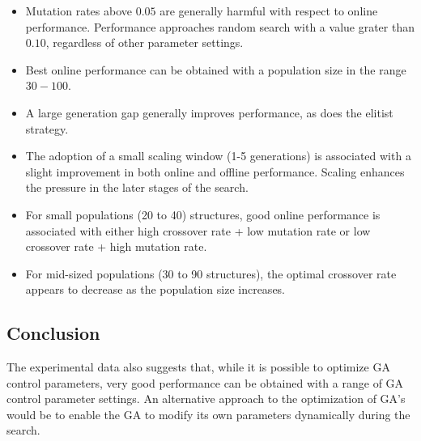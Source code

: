\documentclass[../main.tex]{subfiles}
\begin{document}
\begin{itemize}
	\item Mutation rates above $0.05$ are generally harmful with respect to online performance. Performance approaches
	random search with a value grater than $0.10$, regardless of other parameter settings.
	\item Best online performance can be obtained with a population size in the range $30 - 100$.
	\item A large generation gap generally improves performance, as does the elitist strategy.
	\item The adoption of a small scaling window (1-5 generations) is associated with a slight improvement in both
	online and offline performance. Scaling enhances the pressure in the later stages of the search.
	\item For small populations (20 to 40) structures, good online performance is associated with either high crossover
	rate + low mutation rate or low crossover rate + high mutation rate.
	\item For mid-sized populations (30 to 90 structures), the optimal crossover rate appears to decrease as the
	population size increases.
\end{itemize}

\subsection{Conclusion}
The experimental data also suggests that, while it is possible to optimize GA control parameters, very good
performance can be obtained with a range of GA control parameter settings. An alternative approach to the optimization
of GA's would be to enable the GA to modify its own parameters dynamically
during the search.
\end{document}
